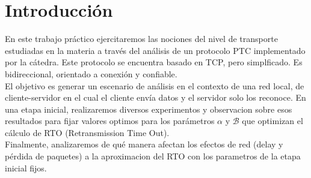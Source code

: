 \section{Introducción}
En este trabajo pr\'actico ejercitaremos las nociones del nivel de transporte estudiadas en la materia a
través del análisis de un protocolo PTC implementado por la c\'atedra. Este protocolo se encuentra basado en TCP, pero simplficado. Es bidireccional, orientado a conexi\'on y confiable.\\

El objetivo es generar un escenario de an\'alisis en el contexto de una red local, de cliente-servidor en el cual el cliente env\'ia datos y el servidor solo los reconoce. En una etapa inicial, realizaremos diversos experimentos y observacion sobre esos resultados para fijar valores optimos para los par\'ametros $\alpha$ y $\mathcal{B}$ que optimizan el c\'alculo de RTO (Retransmission Time Out).\\

Finalmente, analizaremos de qu\'e manera afectan los efectos de red (delay y p\'erdida de paquetes) a la aproximacion del RTO con los parametros de la etapa inicial fijos.